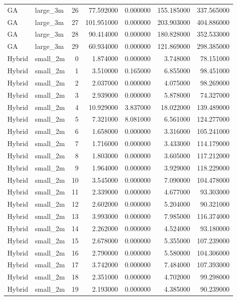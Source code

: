 \begin{tabular}{llrrrrr}
GA & large_3m & 26 & 77.592000 & 0.000000 & 155.185000 & 337.565000 \\
GA & large_3m & 27 & 101.951000 & 0.000000 & 203.903000 & 404.886000 \\
GA & large_3m & 28 & 90.414000 & 0.000000 & 180.828000 & 352.533000 \\
GA & large_3m & 29 & 60.934000 & 0.000000 & 121.869000 & 298.385000 \\
Hybrid & small_2m & 0 & 1.874000 & 0.000000 & 3.748000 & 78.151000 \\
Hybrid & small_2m & 1 & 3.510000 & 0.165000 & 6.855000 & 98.451000 \\
Hybrid & small_2m & 2 & 2.037000 & 0.000000 & 4.075000 & 98.269000 \\
Hybrid & small_2m & 3 & 2.939000 & 0.000000 & 5.878000 & 74.327000 \\
Hybrid & small_2m & 4 & 10.929000 & 3.837000 & 18.022000 & 139.489000 \\
Hybrid & small_2m & 5 & 7.321000 & 8.081000 & 6.561000 & 124.277000 \\
Hybrid & small_2m & 6 & 1.658000 & 0.000000 & 3.316000 & 105.241000 \\
Hybrid & small_2m & 7 & 1.716000 & 0.000000 & 3.433000 & 114.179000 \\
Hybrid & small_2m & 8 & 1.803000 & 0.000000 & 3.605000 & 117.212000 \\
Hybrid & small_2m & 9 & 1.964000 & 0.000000 & 3.929000 & 118.229000 \\
Hybrid & small_2m & 10 & 3.545000 & 0.000000 & 7.090000 & 104.478000 \\
Hybrid & small_2m & 11 & 2.339000 & 0.000000 & 4.677000 & 93.303000 \\
Hybrid & small_2m & 12 & 2.602000 & 0.000000 & 5.204000 & 90.321000 \\
Hybrid & small_2m & 13 & 3.993000 & 0.000000 & 7.985000 & 116.374000 \\
Hybrid & small_2m & 14 & 2.262000 & 0.000000 & 4.524000 & 93.180000 \\
Hybrid & small_2m & 15 & 2.678000 & 0.000000 & 5.355000 & 107.239000 \\
Hybrid & small_2m & 16 & 2.790000 & 0.000000 & 5.580000 & 104.306000 \\
Hybrid & small_2m & 17 & 3.742000 & 0.000000 & 7.484000 & 107.393000 \\
Hybrid & small_2m & 18 & 2.351000 & 0.000000 & 4.702000 & 99.298000 \\
Hybrid & small_2m & 19 & 2.193000 & 0.000000 & 4.385000 & 90.239000 \\

\end{tabular}
